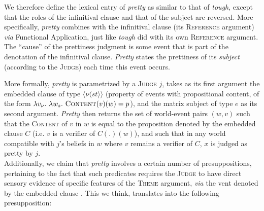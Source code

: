 \documentclass[11pt]{article}
\begin{document}
We therefore define the lexical entry of \textit{{pretty}} as similar to that of \textit{{tough}}, except that the roles of the infinitival clause and that of the subject are reversed. More specifically, \textit{{pretty}} combines with the infinitival clause (its \textsc{Reference} argument) \textit{via} Functional Application, just like \textit{tough} did with its own \textsc{Reference} argument. The ``cause'' of the prettiness judgment is some event that is part of the denotation of the infinitival clause. \textit{Pretty} states the prettiness of its \textit{subject} (according to the \textsc{Judge}) each time this event occurs. 
\begin{center}
\end{center}
More formally, \textit{pretty} is parametrized by a \textsc{Judge} $j$, takes as its first argument the embedded clause of type $\langle \nu \langle st\rangle\rangle$ (property of events with propositional content, of the form $\lambda v_\nu . \ \lambda w_s. \ \textsc{Content}(v)(w) = p$), and the matrix subject of type $e$ as its second argument. \textit{Pretty} then returns the set of world-event pairs $(w, v)$ such that the \textsc{Content} of $v$ in $w$ is equal to the proposition denoted by the embedded clause $C$ (i.e. $v$ is a verifier of $C(.)(w)$), and such that in any world compatible with $j$'s beliefs in $w$ where $v$ remains a verifier of $C$, $x$ is judged as pretty by $j$.\\

Additionally, we claim that \textit{pretty} involves a certain number of presuppositions, pertaining to the fact that such predicates requires the \textsc{Judge} to have direct sensory evidence of specific features of the \textsc{Theme} argument, \textit{via} the vent denoted by the embedded clause \cite{Pearson2012,Hirvonen2016}. This we think, translates into the following presupposition:
\end{document}
